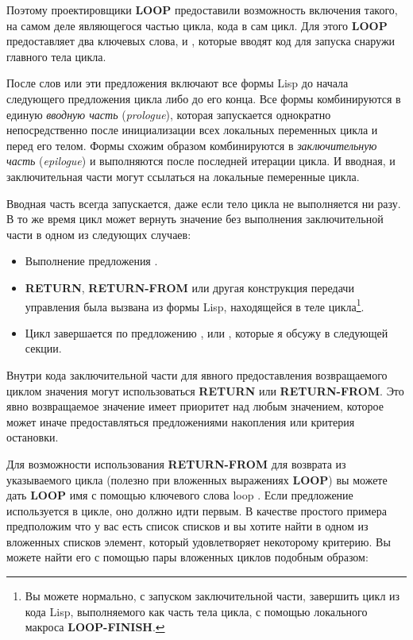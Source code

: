 Поэтому проектировщики \textbf{LOOP} предоставили возможность включения такого, на самом
деле являющегося частью цикла, кода в сам цикл. Для этого \textbf{LOOP} предоставляет два
ключевых слова,  и , которые вводят код для запуска снаружи
главного тела цикла.

После слов  или  эти предложения включают все формы Lisp до
начала следующего предложения цикла либо до его конца. Все формы 
комбинируются в единую \textit{вводную часть} (\textit{prologue}), которая запускается
однократно непосредственно после инициализации всех локальных переменных цикла и перед его
телом. Формы  схожим образом комбинируются в \textit{заключительную часть}
(\textit{epilogue}) и выполняются после последней итерации цикла. И вводная, и
заключительная части могут ссылаться на локальные пемеренные цикла.

Вводная часть всегда запускается, даже если тело цикла не выполняется ни разу. В то же
время цикл может вернуть значение без выполнения заключительной части в одном из следующих
случаев:

\begin{itemize}
\item Выполнение предложения .
\item \textbf{RETURN}, \textbf{RETURN-FROM} или другая конструкция передачи управления
  была вызвана из формы Lisp, находящейся в теле цикла\footnote{Вы можете нормально, с
    запуском заключительной части, завершить цикл из кода Lisp, выполняемого как часть
    тела цикла, с помощью локального макроса \textbf{LOOP-FINISH}.}.
\item Цикл завершается по предложению ,  или ,
  которые я обсужу в следующей секции.
\end{itemize}

Внутри кода заключительной части для явного предоставления возвращаемого циклом значения
могут использоваться \textbf{RETURN} или \textbf{RETURN-FROM}. Это явно возвращаемое
значение имеет приоритет над любым значением, которое может иначе предоставляться
предложениями накопления или критерия остановки.

Для возможности использования \textbf{RETURN-FROM} для возврата из указываемого цикла
(полезно при вложенных выражениях \textbf{LOOP}) вы можете дать \textbf{LOOP} имя с
помощью ключевого слова loop . Если предложение  используется в
цикле, оно должно идти первым. В качестве простого примера предположим что у вас есть
список списков и вы хотите найти в одном из вложенных списков элемент, который
удовлетворяет некоторому критерию. Вы можете найти его с помощью пары вложенных циклов
подобным образом:

